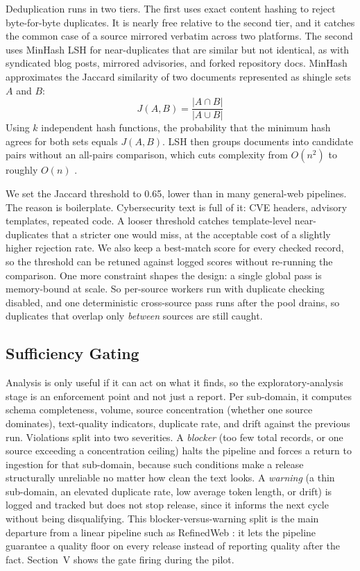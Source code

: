 \documentclass[conference]{IEEEtran}
\begin{document}
Deduplication runs in two tiers. The first uses exact content hashing
to reject byte-for-byte duplicates. It is nearly free relative to the
second tier, and it catches the common case of a source mirrored
verbatim across two platforms. The second uses MinHash LSH
\cite{leskovec2014mmd} for near-duplicates that are similar but not
identical, as with syndicated blog posts, mirrored advisories, and
forked repository docs. MinHash approximates the Jaccard similarity of
two documents represented as shingle sets $A$ and $B$:
\begin{equation}
  J(A, B) = \frac{|A \cap B|}{|A \cup B|}
\end{equation}
Using $k$ independent hash functions, the probability that the minimum
hash agrees for both sets equals $J(A,B)$. LSH then groups documents
into candidate pairs without an all-pairs comparison, which cuts
complexity from $O(n^2)$ to roughly $O(n)$ \cite{leskovec2014mmd}.

We set the Jaccard threshold to 0.65, lower than in many general-web
pipelines. The reason is boilerplate. Cybersecurity text is full of it:
CVE headers, advisory templates, repeated code. A looser threshold
catches template-level near-duplicates that a stricter one would miss,
at the acceptable cost of a slightly higher rejection rate. We also keep
a best-match score for every checked record, so the threshold can be
retuned against logged scores without re-running the comparison. One
more constraint shapes the design: a single global pass is memory-bound
at scale. So per-source workers run with duplicate checking disabled,
and one deterministic cross-source pass runs after the pool drains, so
duplicates that overlap only \emph{between} sources are still caught.

\subsection{Sufficiency Gating}

Analysis is only useful if it can act on what it finds, so the
exploratory-analysis stage is an enforcement point and not just a
report. Per sub-domain, it computes schema completeness, volume, source
concentration (whether one source dominates), text-quality indicators,
duplicate rate, and drift against the previous run. Violations split
into two severities. A \emph{blocker} (too few total records, or one
source exceeding a concentration ceiling) halts the pipeline and forces
a return to ingestion for that sub-domain, because such conditions make
a release structurally unreliable no matter how clean the text looks.
A \emph{warning} (a thin sub-domain, an elevated duplicate rate, low
average token length, or drift) is logged and tracked but does not stop
release, since it informs the next cycle without being disqualifying.
This blocker-versus-warning split is the main departure from a linear
pipeline such as RefinedWeb \cite{penedo2023refinedweb}: it lets the
pipeline guarantee a quality floor on every release instead of
reporting quality after the fact. Section~V shows the gate firing
during the pilot.
\end{document}
